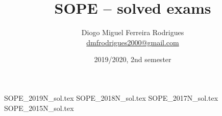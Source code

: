 \documentclass{sope}
\title{SOPE -- solved exams}
\author{Diogo Miguel Ferreira Rodrigues \\ \href{mailto:dmfrodrigues2000@gmail.com}{dmfrodrigues2000@gmail.com}}
\date{2019/2020, 2nd semester}
\begin{document}
\frontmatter
\maketitle
\setcounter{tocdepth}{2}
\tableofcontents
\mainmatter
{SOPE_2019N_sol.tex}
{SOPE_2018N_sol.tex}
{SOPE_2017N_sol.tex}
{SOPE_2015N_sol.tex}
\end{document}
